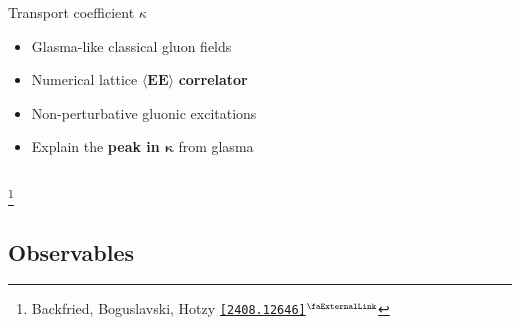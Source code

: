 \documentclass[aspectratio=169,11pt,usenames,dvipsnames]{beamer}
\renewcommand{\thefootnote}{\color{customblue}\faPaperPlaneO}
\newcommand\blfootnote[1]{%
  \begingroup
  \renewcommand\thefootnote{}\footnote{#1}%
  \addtocounter{footnote}{-1}%
  \endgroup
}
\begin{document}
\begin{frame}[t,noframenumbering]
\begin{columns}[onlytextwidth,t]
        \begin{center}
            {\Large\color{palteal} Transport coefficient $\kappa$ \\[10pt]}
            \footnotesize
                \begin{itemize}
                    \item {\color{lightgray}Glasma-like classical gluon fields}
                    \item {\color{lightgray}Numerical lattice $\boldsymbol{\langle EE\rangle}$ {\bfseries  correlator}}
                    \item {\color{lightgray}Non-perturbative gluonic excitations}
                    \item {\color{lightgray}Explain the {\bfseries peak in $\boldsymbol{\kappa}$} from glasma}
                \end{itemize}
        \end{center}
    \end{columns}
    \blfootnote{\scriptsize Backfried, Boguslavski, Hotzy \href{https://arxiv.org/abs/2408.12646}{\color{palgold}\texttt{[2408.12646]}$^\text{\scalebox{0.9}{\faExternalLink}}$}}
\end{frame}










\subsection{Observables}
\end{document}
